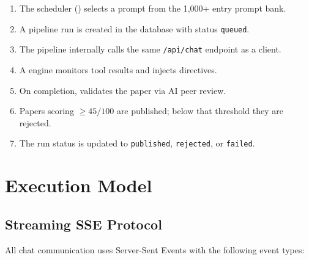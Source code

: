 \begin{enumerate}
  \item The scheduler () selects a prompt from the 1,000+ entry prompt bank.
  \item A pipeline run is created in the database with status \texttt{queued}.
  \item The pipeline internally calls the same \texttt{/api/chat} endpoint as a client.
  \item A \governor engine monitors tool results and injects directives.
  \item On completion, \popper validates the paper via AI peer review.
  \item Papers scoring $\geq 45/100$ are published; below that threshold they are rejected.
  \item The run status is updated to \texttt{published}, \texttt{rejected}, or \texttt{failed}.
\end{enumerate}

\section{Execution Model}
\label{sec:arch:execution}

\subsection{Streaming SSE Protocol}

All chat communication uses Server-Sent Events with the following event types:

